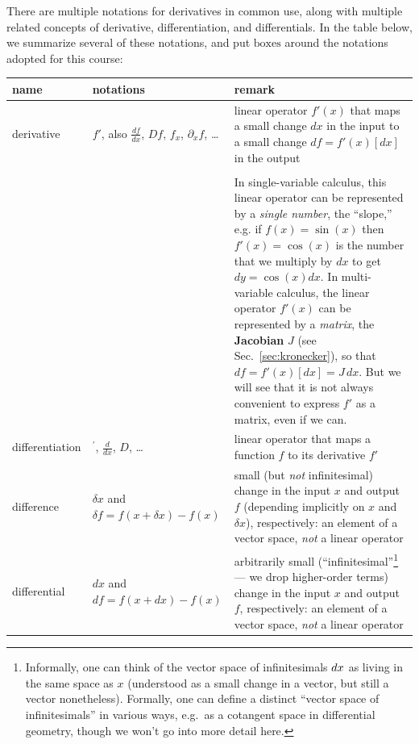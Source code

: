 \begin{notation}

There are multiple notations for derivatives in common use, along with multiple related concepts of derivative, differentiation, and differentials.  In the table below, we summarize several of these notations, and put $\boxed{\mathrm{boxes}}$ around the notations adopted for this course:

\vspace{.2cm}

\begin{tabular}{| m{2.1cm} | m{5cm}| m{7cm} |}
\hline
name & notations & remark\tabularnewline
\hline
\hline
derivative
 & $\boxed{f'}$, also $\frac{df}{dx}$, $Df$, $f_{x}$, $\partial_{x}f$,
\dots{} & linear operator $f'(x)$ that maps a small change $dx$ in the input to a small
change ${df=f'(x)[dx]}$ in the output \\
& &
\\
&  & In single-variable calculus, this linear operator can be represented by a \emph{single number}, the ``slope,'' e.g. if $f(x) = \sin(x)$ then $f'(x) = \cos(x)$ is the number that we multiply by $dx$ to get $dy = \cos(x) dx$.  In multi-variable calculus, the linear operator $f'(x)$ can be represented by a \emph{matrix}, the {\bf Jacobian} $J$ (see Sec.~\ref{sec:kronecker}), so that $df = f'(x)[dx] = J\, dx$.  But we will see that it is not always convenient to express $f'$ as a matrix, even if we can.
\tabularnewline
\hline
differentiation & $\boxed{^{\prime}}$, $\frac{d}{dx}$, $D$, \dots{} & linear operator that maps a function $f$ to its derivative $f'$ \tabularnewline
\hline
difference & $\boxed{\delta x}$ and $\boxed{\delta f} = f(x+\delta x) - f(x)$  & small (but \emph{not} infinitesimal) change in the input  $x$ and output $f$ (depending implicitly on $x$ and $\delta x$), respectively:
an element of a vector space, \emph{not} a linear operator\tabularnewline
\hline
differential & $\boxed{d x}$ and $\boxed{d f} = f(x+dx) - f(x)$  & arbitrarily small (``infinitesimal''\footnote{Informally, one can think of the vector space of infinitesimals $d x$ as living in the same space as $x$  (understood as a small change in a vector, but still a vector nonetheless). Formally, one can define a distinct ``vector space of infinitesimals'' in various ways, e.g.~as a cotangent space in differential geometry, though we won't go into more detail here.} --- we drop higher-order terms) change in the input  $x$ and output $f$, respectively:
an element of a vector space, \emph{not} a linear operator\tabularnewline

\end{tabular}
\end{notation}
